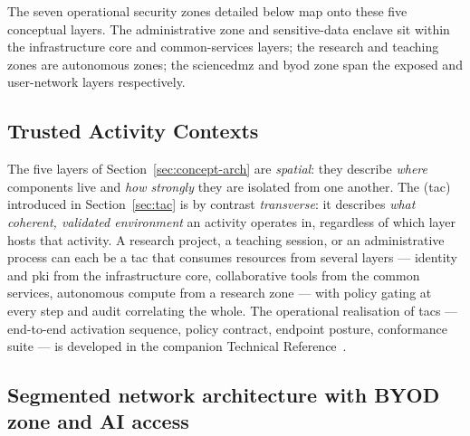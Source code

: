 \noindent
The seven operational security zones detailed below map onto these five
conceptual layers. The administrative zone and sensitive-data enclave sit
within the infrastructure core and common-services layers; the research
and teaching zones are autonomous zones; the \gls{sciencedmz} and \gls{byod} zone
span the exposed and user-network layers respectively.

\subsection{Trusted Activity Contexts}
\label{sec:propositions-tac}

\begin{tcolorbox}[
    colback=NavyBlue!4!white,
    colframe=NavyBlue!75!black,
    boxrule=0.6pt,
    sharp corners=south,
    title={\textbf{The transverse role of Trusted Activity Contexts}}
]
The five layers of Section~\ref{sec:concept-arch} are \emph{spatial}:
they describe \emph{where} components live and \emph{how strongly}
they are isolated from one another. The  (\gls{tac}) introduced in Section~\ref{sec:tac} is by
contrast \emph{transverse}: it describes \emph{what coherent,
validated environment} an activity operates in, regardless of which
layer hosts that activity. A research project, a teaching session,
or an administrative process can each be a \gls{tac} that consumes
resources from several layers --- identity and \gls{pki} from the
infrastructure core, collaborative tools from the common services,
autonomous compute from a research zone --- with policy gating at
every step and audit correlating the whole. The operational
realisation of \gls{tac}s --- end-to-end activation sequence, policy
contract, endpoint posture, conformance suite --- is developed in
the companion Technical Reference~\cite{ng-tech-ref-2026}.
\end{tcolorbox}

\subsection{Segmented network architecture with BYOD zone and AI access}

